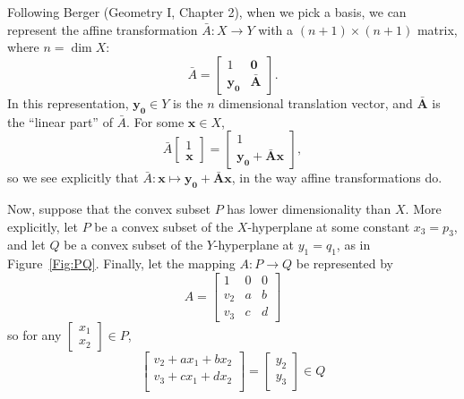 \documentclass[11pt]{article}
\begin{document}
Following Berger (Geometry I, Chapter 2), when we pick a basis, we can
represent the affine transformation $\bar{A}: X \rightarrow Y$ with a
$(n+1)\times(n+1)$ matrix, where $n = \dim X$:
\begin{equation}\label{Eqn:Abar}
  \bar{A} = \left[
    \begin{matrix}
      1          & \mathbf{0}  \\ 
      \mathbf{y_0} & \mathbf{\bar{A}}
    \end{matrix}
  \right].
\end{equation}
In this representation, $\mathbf{y_0} \in Y$ is the $n$ dimensional
translation vector, and $\mathbf{\bar{A}}$ is the ``linear part'' of
$\bar{A}$.  For some $\mathbf{x} \in X$,
\begin{equation}\label{Eqn:AbarX}
  \bar{A}\left[ \begin{matrix} 1 \\ \mathbf{x}              \end{matrix}\right] =
         \left[ \begin{matrix} 1 \\ \mathbf{y_0 + \bar{A}x} \end{matrix}\right],
\end{equation}
so we see explicitly that $\bar{A}: \mathbf{x} \mapsto \mathbf{y_0 +
  \bar{A}x}$, in the way affine transformations do.

Now, suppose that the convex subset $P$ has lower dimensionality than
$X$.  More explicitly, let $P$ be a convex subset of the
$X$-hyperplane at some constant $x_3 = p_3$, and let $Q$ be a convex
subset of the $Y$-hyperplane at $y_1 = q_1$, as in
Figure~\ref{Fig:PQ}.  Finally, let the mapping $A: P \rightarrow Q$ be
represented by
\begin{equation}
  A = \left[
    \begin{matrix}
      1   & 0 & 0 \\
      v_2 & a & b \\
      v_3 & c & d
    \end{matrix}
    \right]
\end{equation}
so for any $\left[
  \begin{matrix}
    x_1 \\ x_2
  \end{matrix}
  \right] \in P$,
\begin{equation}\label{Eqn:A}
  \left[
    \begin{matrix}
      v_2 + ax_1 + bx_2 \\
      v_3 + cx_1 + dx_2 \\
    \end{matrix} \right] =
  \left[
    \begin{matrix}
      y_2 \\ y_3
    \end{matrix} \right] \in Q
\end{equation}
\end{document}
